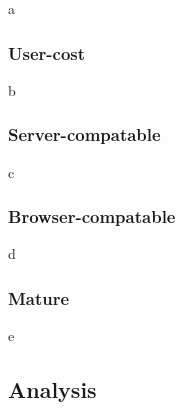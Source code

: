 \begin{CJK}{Bg5}{bsmi}
a

\subsubsection{User-cost}

b

\subsubsection{Server-compatable}

c

\subsubsection{Browser-compatable}

d

\subsubsection{Mature}

e

\subsection{Analysis}

\begin{comment}
The deployment ability is also an important thing which is need to be considered, especially in designing an authentication system.
A system with high usability means it is friendly to users; a system with high deployment ability means it is friendly to the system provider or, more precise, the developers.
The following paragraph states the criterias I used to estimate a system's deployment ability. 
\end{comment}


\end{CJK}